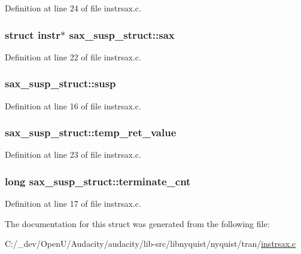 Definition at line 24 of file instrsax.\+c.

\subsubsection[{\texorpdfstring{sax}{sax}}]{\setlength{\rightskip}{0pt plus 5cm}struct {\bf instr}$\ast$ sax\+\_\+susp\+\_\+struct\+::sax}\hypertarget{structsax__susp__struct_a13a2e6a117f3e9c5647c4fdafee8c350}{}\label{structsax__susp__struct_a13a2e6a117f3e9c5647c4fdafee8c350}


Definition at line 22 of file instrsax.\+c.

\subsubsection[{\texorpdfstring{susp}{susp}}]{ sax\+\_\+susp\+\_\+struct\+::susp}\hypertarget{structsax__susp__struct_a26726c75098c4ccc67fabfb95b11cc03}{}\label{structsax__susp__struct_a26726c75098c4ccc67fabfb95b11cc03}


Definition at line 16 of file instrsax.\+c.

\subsubsection[{\texorpdfstring{temp\+\_\+ret\+\_\+value}{temp_ret_value}}]{ sax\+\_\+susp\+\_\+struct\+::temp\+\_\+ret\+\_\+value}\hypertarget{structsax__susp__struct_a1f4df3f09c7c1f715375f92d95743523}{}\label{structsax__susp__struct_a1f4df3f09c7c1f715375f92d95743523}


Definition at line 23 of file instrsax.\+c.

\subsubsection[{\texorpdfstring{terminate\+\_\+cnt}{terminate_cnt}}]{\setlength{\rightskip}{0pt plus 5cm}long sax\+\_\+susp\+\_\+struct\+::terminate\+\_\+cnt}\hypertarget{structsax__susp__struct_ab88ea967f932437505713c35b8668b56}{}\label{structsax__susp__struct_ab88ea967f932437505713c35b8668b56}


Definition at line 17 of file instrsax.\+c.



The documentation for this struct was generated from the following file\+:\begin{DoxyCompactItemize}
\item 
C\+:/\+\_\+dev/\+Open\+U/\+Audacity/audacity/lib-\/src/libnyquist/nyquist/tran/\hyperlink{instrsax_8c}{instrsax.\+c}\end{DoxyCompactItemize}
